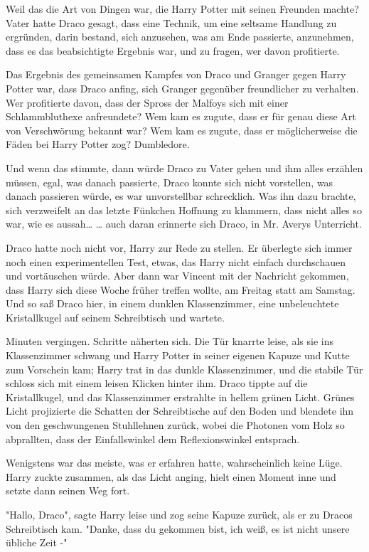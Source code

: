 {Weil das die Art von Dingen war, die Harry Potter mit seinen Freunden machte? Vater hatte Draco gesagt, dass eine Technik, um eine seltsame Handlung zu ergründen, darin bestand, sich anzusehen, was am Ende passierte, anzunehmen, dass es das beabsichtigte Ergebnis war, und zu fragen, wer davon profitierte.

Das Ergebnis des gemeinsamen Kampfes von Draco und Granger gegen Harry Potter war, dass Draco anfing, sich Granger gegenüber freundlicher zu verhalten. Wer profitierte davon, dass der Spross der Malfoys sich mit einer Schlammbluthexe anfreundete? Wem kam es zugute, dass er für genau diese Art von Verschwörung bekannt war? Wem kam es zugute, dass er möglicherweise die Fäden bei Harry Potter zog? Dumbledore.

Und wenn das stimmte, dann würde Draco zu Vater gehen und ihm alles erzählen müssen, egal, was danach passierte, Draco konnte sich nicht vorstellen, was danach passieren würde, es war unvorstellbar schrecklich. Was ihn dazu brachte, sich verzweifelt an das letzte Fünkchen Hoffnung zu klammern, dass nicht alles so war, wie es aussah… … auch daran erinnerte sich Draco, in Mr. Averys Unterricht.

Draco hatte noch nicht vor, Harry zur Rede zu stellen. Er überlegte sich immer noch einen experimentellen Test, etwas, das Harry nicht einfach durchschauen und vortäuschen würde. Aber dann war Vincent mit der Nachricht gekommen, dass Harry sich diese Woche früher treffen wollte, am Freitag statt am Samstag. Und so saß Draco hier, in einem dunklen Klassenzimmer, eine unbeleuchtete Kristallkugel auf seinem Schreibtisch und wartete.

Minuten vergingen. Schritte näherten sich. Die Tür knarrte leise, als sie ins Klassenzimmer schwang und Harry Potter in seiner eigenen Kapuze und Kutte zum Vorschein kam; Harry trat in das dunkle Klassenzimmer, und die stabile Tür schloss sich mit einem leisen Klicken hinter ihm. Draco tippte auf die Kristallkugel, und das Klassenzimmer erstrahlte in hellem grünen Licht. Grünes Licht projizierte die Schatten der Schreibtische auf den Boden und blendete ihn von den geschwungenen Stuhllehnen zurück, wobei die Photonen vom Holz so abprallten, dass der Einfallswinkel dem Reflexionswinkel entsprach.

Wenigstens war das meiste, was er erfahren hatte, wahrscheinlich keine Lüge. Harry zuckte zusammen, als das Licht anging, hielt einen Moment inne und setzte dann seinen Weg fort.

"Hallo, Draco", sagte Harry leise und zog seine Kapuze zurück, als er zu Dracos Schreibtisch kam. "Danke, dass du gekommen bist, ich weiß, es ist nicht unsere übliche Zeit -"

}
